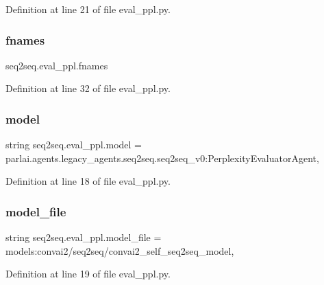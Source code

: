 Definition at line 21 of file eval\+\_\+ppl.\+py.

\mbox{\label{namespaceseq2seq_1_1eval__ppl_acfe94383616d9824aa2f479f2cd9dc8d}} 
\subsubsection{\texorpdfstring{fnames}{fnames}}
{\footnotesize\ttfamily seq2seq.\+eval\+\_\+ppl.\+fnames}



Definition at line 32 of file eval\+\_\+ppl.\+py.

\mbox{\label{namespaceseq2seq_1_1eval__ppl_a7894e8b2693db6cfe74e06b0ac615510}} 
\subsubsection{\texorpdfstring{model}{model}}
{\footnotesize\ttfamily string seq2seq.\+eval\+\_\+ppl.\+model = \textquotesingle{}parlai.\+agents.\+legacy\+\_\+agents.\+seq2seq.\+seq2seq\+\_\+v0\+:\+Perplexity\+Evaluator\+Agent\textquotesingle{},}



Definition at line 18 of file eval\+\_\+ppl.\+py.

\mbox{\label{namespaceseq2seq_1_1eval__ppl_aff409caa6df192230a92fa5a1579af16}} 
\subsubsection{\texorpdfstring{model\+\_\+file}{model\_file}}
{\footnotesize\ttfamily string seq2seq.\+eval\+\_\+ppl.\+model\+\_\+file = \textquotesingle{}models\+:convai2/seq2seq/convai2\+\_\+self\+\_\+seq2seq\+\_\+model\textquotesingle{},}



Definition at line 19 of file eval\+\_\+ppl.\+py.


